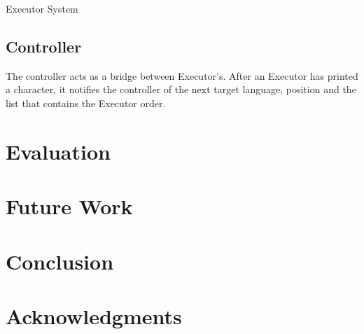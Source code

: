 \documentclass[11pt]{article}
\begin{document}
\begin{algorithm}
\caption{Executor System}
\label{Special Edition}
\begin{algorithmic}[2]
\EndProcedure
\end{algorithmic}
\end{algorithm}

\subsection{Controller}
The controller acts as a bridge between Executor's. After an Executor has printed a character, it notifies the controller of the next target language, position and the list that contains the Executor order.


\section{Evaluation}

\section{Future Work}

\section{Conclusion}

\section*{Acknowledgments}




\end{document}
